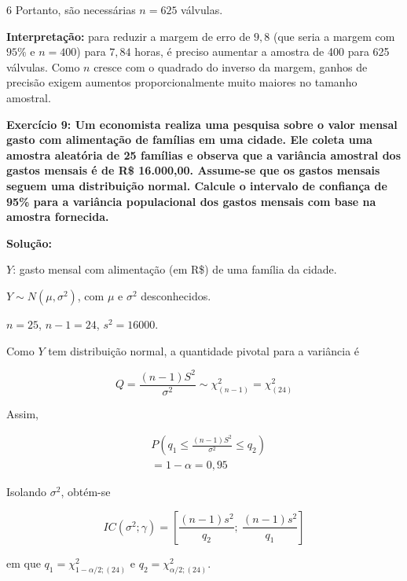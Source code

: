 \documentclass[8pt, a4paper, landscape]{extarticle}
\begin{document}
\begin{multicols}{6}
Portanto, são necessárias $n = 625$ válvulas.

\textbf{Interpretação:} para reduzir a margem de erro de $9,8$ (que seria a margem com $95\%$ e $n = 400$) para $7,84$ horas, é preciso aumentar a amostra de 400 para 625 válvulas. Como $n$ cresce com o quadrado do inverso da margem, ganhos de precisão exigem aumentos proporcionalmente muito maiores no tamanho amostral.

\textbf{Exercício 9: Um economista realiza uma pesquisa sobre o valor mensal gasto com alimentação de famílias em uma cidade. Ele coleta uma amostra aleatória de 25 famílias e observa que a variância amostral dos gastos mensais é de R\$ 16.000,00. Assume-se que os gastos mensais seguem uma distribuição normal. Calcule o intervalo de confiança de 95\% para a variância populacional dos gastos mensais com base na amostra fornecida.}

\vspace{0.3cm}

\textbf{Solução:}

$Y$: gasto mensal com alimentação (em R\$) de uma família da cidade.

$Y \sim N(\mu, \sigma^2)$, com $\mu$ e $\sigma^2$ desconhecidos.

$n = 25$, \quad $n - 1 = 24$, \quad $s^2 = 16000$.

Como $Y$ tem distribuição normal, a quantidade pivotal para a variância é

\begin{equation*}
Q = \frac{(n-1)S^2}{\sigma^2} \sim \chi^2_{(n-1)} = \chi^2_{(24)}
\end{equation*}

Assim,

\begin{equation*}
\begin{split}
&P\left(q_1 \leq \frac{(n-1)S^2}{\sigma^2} \leq q_2\right) \\
&= 1 - \alpha = 0,95
\end{split}
\end{equation*}

Isolando $\sigma^2$, obtém-se

\begin{equation*}
IC(\sigma^2;\gamma) = \left[\frac{(n-1)s^2}{q_2};\ \frac{(n-1)s^2}{q_1}\right]
\end{equation*}

em que $q_1 = \chi^2_{1-\alpha/2;(24)}$ e $q_2 = \chi^2_{\alpha/2;(24)}$.


\end{multicols}
\end{document}
